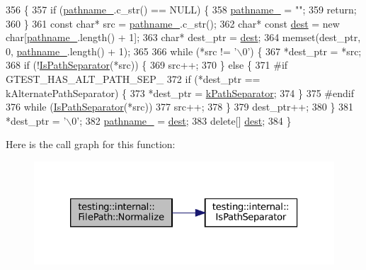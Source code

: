 \begin{DoxyCode}
356                          \{
357   \textcolor{keywordflow}{if} (\hyperlink{classtesting_1_1internal_1_1FilePath_a12ce28a0015f85604e0372230fa18d6e}{pathname\_}.c\_str() == NULL) \{
358     \hyperlink{classtesting_1_1internal_1_1FilePath_a12ce28a0015f85604e0372230fa18d6e}{pathname\_} = \textcolor{stringliteral}{""};
359     \textcolor{keywordflow}{return};
360   \}
361   \textcolor{keyword}{const} \textcolor{keywordtype}{char}* src = \hyperlink{classtesting_1_1internal_1_1FilePath_a12ce28a0015f85604e0372230fa18d6e}{pathname\_}.c\_str();
362   \textcolor{keywordtype}{char}* \textcolor{keyword}{const} \hyperlink{namespaceupload_a770d9c7b49b1fede80de6078d5e49af7}{dest} = \textcolor{keyword}{new} \textcolor{keywordtype}{char}[\hyperlink{classtesting_1_1internal_1_1FilePath_a12ce28a0015f85604e0372230fa18d6e}{pathname\_}.length() + 1];
363   \textcolor{keywordtype}{char}* dest\_ptr = \hyperlink{namespaceupload_a770d9c7b49b1fede80de6078d5e49af7}{dest};
364   memset(dest\_ptr, 0, \hyperlink{classtesting_1_1internal_1_1FilePath_a12ce28a0015f85604e0372230fa18d6e}{pathname\_}.length() + 1);
365 
366   \textcolor{keywordflow}{while} (*src != \textcolor{charliteral}{'\(\backslash\)0'}) \{
367     *dest\_ptr = *src;
368     \textcolor{keywordflow}{if} (!\hyperlink{namespacetesting_1_1internal_a6b8d22cee9edbbfe56077420a6fa1cb1}{IsPathSeparator}(*src)) \{
369       src++;
370     \} \textcolor{keywordflow}{else} \{
371 \textcolor{preprocessor}{#if GTEST\_HAS\_ALT\_PATH\_SEP\_}
372       \textcolor{keywordflow}{if} (*dest\_ptr == kAlternatePathSeparator) \{
373         *dest\_ptr = \hyperlink{namespacetesting_1_1internal_afcd71adaa9d1e6df7b282a17fc48125c}{kPathSeparator};
374       \}
375 \textcolor{preprocessor}{#endif}
376       \textcolor{keywordflow}{while} (\hyperlink{namespacetesting_1_1internal_a6b8d22cee9edbbfe56077420a6fa1cb1}{IsPathSeparator}(*src))
377         src++;
378     \}
379     dest\_ptr++;
380   \}
381   *dest\_ptr = \textcolor{charliteral}{'\(\backslash\)0'};
382   \hyperlink{classtesting_1_1internal_1_1FilePath_a12ce28a0015f85604e0372230fa18d6e}{pathname\_} = \hyperlink{namespaceupload_a770d9c7b49b1fede80de6078d5e49af7}{dest};
383   \textcolor{keyword}{delete}[] \hyperlink{namespaceupload_a770d9c7b49b1fede80de6078d5e49af7}{dest};
384 \}
\end{DoxyCode}
Here is the call graph for this function\+:
\nopagebreak
\begin{figure}[H]
\begin{center}
\leavevmode
\includegraphics[width=326pt]{classtesting_1_1internal_1_1FilePath_aa2f6d7d7823f71f25de50d309c966ef7_cgraph}
\end{center}
\end{figure}
